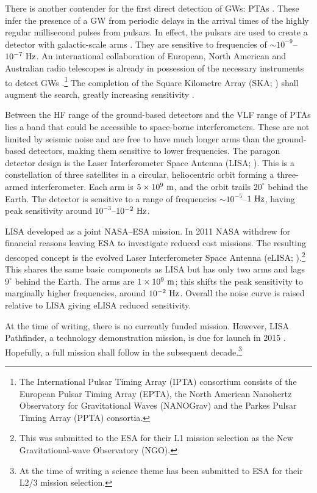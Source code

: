 There is another contender for the first direct detection of GWs: PTAs \citep{McWilliams2012,Sesana2012a}. These infer the presence of a GW from periodic delays in the arrival times of the highly regular millisecond pulses from pulsars. In effect, the pulsars are used to create a detector with galactic-scale arms \citep{Hellings1983}. They are sensitive to frequencies of $\sim10^{-9}$--$10^{-7}~\mathrm{Hz}$. An international collaboration of European, North American and Australian radio telescopes is already in possession of the necessary instruments to detect GWs \citep{Hobbs2010}.\footnote{The International Pulsar Timing Array (IPTA) consortium consists of the European Pulsar Timing Array (EPTA), the North American Nanohertz Observatory for Gravitational Waves (NANOGrav) and the Parkes Pulsar Timing Array (PPTA) consortia.} The completion of the Square Kilometre Array (SKA; \citealt{Dewdney2009}) shall augment the search, greatly increasing sensitivity \citep{Kramer2004}.

Between the HF range of the ground-based detectors and the VLF range of PTAs lies a band that could be accessible to space-borne interferometers. These are not limited by seismic noise and are free to have much longer arms than the ground-based detectors, making them sensitive to lower frequencies. The paragon detector design is the Laser Interferometer Space Antenna (LISA; \citealt{Bender1998, Danzmann2003}). This is a constellation of three satellites in a circular, heliocentric orbit forming a three-armed interferometer. Each arm is $5 \times 10^9~\mathrm{m}$, and the orbit trails $20^{\circ}$ behind the Earth. The detector is sensitive to a range of frequencies $\sim10^{-5}$--$1~\mathrm{Hz}$, having peak sensitivity around $10^{-3}$--$10^{-2}~\mathrm{Hz}$.

LISA developed as a joint NASA--ESA mission. In 2011 NASA withdrew for financial reasons leaving ESA to investigate reduced cost missions. The resulting descoped concept is the evolved Laser Interferometer Space Antenna (eLISA; \citealt{Jennrich2011, Amaro-Seoane2012a}).\footnote{This was submitted to the ESA for their L1 mission selection as the New Gravitational-wave Observatory (NGO).} This shares the same basic components as LISA but has only two arms and lags $9^{\circ}$ behind the Earth. The arms are $1 \times 10^9~\mathrm{m}$; this shifts the peak sensitivity to marginally higher frequencies, around $10^{-2}~\mathrm{Hz}$. Overall the noise curve is raised relative to LISA giving eLISA reduced sensitivity.

At the time of writing, there is no currently funded mission. However, LISA Pathfinder, a technology demonstration mission, is due for launch in 2015 \citep{Anza2005, Antonucci2012}. Hopefully, a full mission shall follow in the subsequent decade.\footnote{At the time of writing a science theme has been submitted to ESA for their L2/3 mission selection.}

